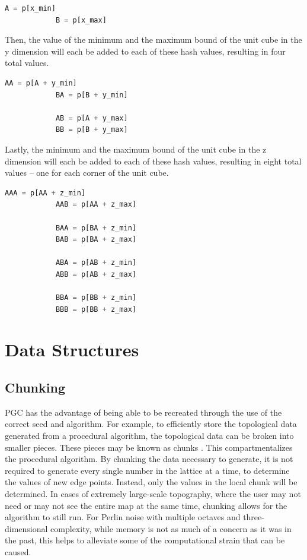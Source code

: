 \documentclass[10pt]{report}
\begin{document}
		\begin{lstlisting}[label={lst:hashx}, language=Python, frame=none]
			A = p[x_min]
			B = p[x_max]
		\end{lstlisting}
		
		Then, the value of the minimum and the maximum bound of the unit cube in the y dimension will each be added to each of these hash values, resulting in four total values. 
		
		\begin{lstlisting}[label={lst:hashx}, language=Python, frame=none]
			AA = p[A + y_min]
			BA = p[B + y_min]
			
			AB = p[A + y_max]
			BB = p[B + y_max]
		\end{lstlisting}
	
		Lastly, the  minimum and the maximum bound of the unit cube in the z dimension will each be added to each of these hash values, resulting in eight total values -- one for each corner of the unit cube. 
		
		\begin{lstlisting}[label={lst:hashx}, language=Python, frame=none]
			AAA = p[AA + z_min]
			AAB = p[AA + z_max]
			
			BAA = p[BA + z_min]
			BAB = p[BA + z_max]
			
			ABA = p[AB + z_min]
			ABB = p[AB + z_max]
			
			BBA = p[BB + z_min]
			BBB = p[BB + z_max]
		\end{lstlisting}
		
	\vspace{10pt}
	\let\clearpage\relax
	\chapter{Data Structures} \label{chap:data_structures}
	
		\section{Chunking}
			PGC has the advantage of being able to be recreated through the use of the correct seed and algorithm. For example, to efficiently store the topological data generated from a procedural algorithm, the topological data can be broken into smaller pieces. These pieces may be known as chunks \cite{tiling}. This compartmentalizes the procedural algorithm. By chunking the data necessary to generate, it is not required to generate every single number in the lattice at a time, to determine the values of new edge points. Instead, only the values in the local chunk will be determined. In cases of extremely large-scale topography, where the user may not need or may not see the entire map at the same time, chunking allows for the algorithm to still run. For Perlin noise with multiple octaves and three-dimensional complexity, while memory is not as much of a concern as it was in the past, this helps to alleviate some of the computational strain that can be caused. 
	
\end{document}
